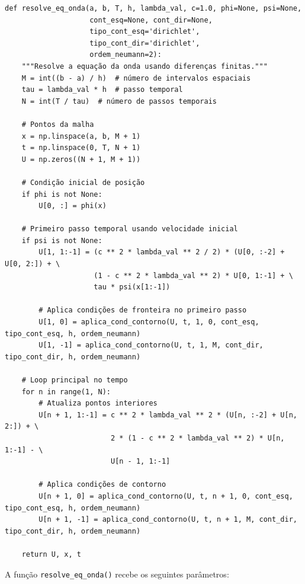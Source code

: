 \documentclass[column,amsmath,amssymb,floatfix]{revtex4}
\begin{document}
\begin{lstlisting}
def resolve_eq_onda(a, b, T, h, lambda_val, c=1.0, phi=None, psi=None,
                    cont_esq=None, cont_dir=None,
                    tipo_cont_esq='dirichlet',
                    tipo_cont_dir='dirichlet',
                    ordem_neumann=2):
    """Resolve a equação da onda usando diferenças finitas."""
    M = int((b - a) / h)  # número de intervalos espaciais
    tau = lambda_val * h  # passo temporal
    N = int(T / tau)  # número de passos temporais

    # Pontos da malha
    x = np.linspace(a, b, M + 1)
    t = np.linspace(0, T, N + 1)
    U = np.zeros((N + 1, M + 1))

    # Condição inicial de posição
    if phi is not None:
        U[0, :] = phi(x)

    # Primeiro passo temporal usando velocidade inicial
    if psi is not None:
        U[1, 1:-1] = (c ** 2 * lambda_val ** 2 / 2) * (U[0, :-2] + U[0, 2:]) + \
                     (1 - c ** 2 * lambda_val ** 2) * U[0, 1:-1] + \
                     tau * psi(x[1:-1])

        # Aplica condições de fronteira no primeiro passo
        U[1, 0] = aplica_cond_contorno(U, t, 1, 0, cont_esq, tipo_cont_esq, h, ordem_neumann)
        U[1, -1] = aplica_cond_contorno(U, t, 1, M, cont_dir, tipo_cont_dir, h, ordem_neumann)

    # Loop principal no tempo
    for n in range(1, N):
        # Atualiza pontos interiores
        U[n + 1, 1:-1] = c ** 2 * lambda_val ** 2 * (U[n, :-2] + U[n, 2:]) + \
                         2 * (1 - c ** 2 * lambda_val ** 2) * U[n, 1:-1] - \
                         U[n - 1, 1:-1]

        # Aplica condições de contorno
        U[n + 1, 0] = aplica_cond_contorno(U, t, n + 1, 0, cont_esq, tipo_cont_esq, h, ordem_neumann)
        U[n + 1, -1] = aplica_cond_contorno(U, t, n + 1, M, cont_dir, tipo_cont_dir, h, ordem_neumann)

    return U, x, t
\end{lstlisting}
A função \texttt{resolve\_eq\_onda()} recebe os seguintes parâmetros:
\end{document}
